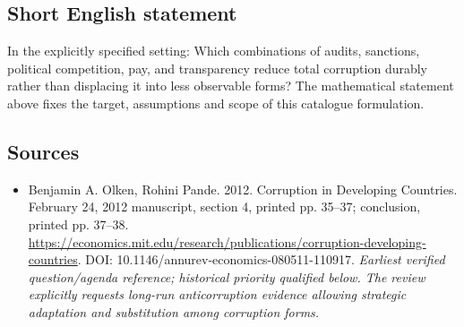 \documentclass[11pt]{article}
\begin{document}
\subsection{Short English statement}
In the explicitly specified setting: Which combinations of audits, sanctions, political competition, pay, and transparency reduce total corruption durably rather than displacing it into less observable forms? The mathematical statement above fixes the target, assumptions and scope of this catalogue formulation.

\subsection{Sources}
\begin{itemize}\raggedright
\item[\textnormal{[S1]}]\hypertarget{source:30007665:1}{} Benjamin A. Olken, Rohini Pande. 2012. Corruption in Developing Countries. February 24, 2012 manuscript, section 4, printed pp. 35–37; conclusion, printed pp. 37–38.
\url{https://economics.mit.edu/research/publications/corruption-developing-countries}.
DOI: 10.1146/annurev-economics-080511-110917.
{\small\textit{Earliest verified question/agenda reference; historical priority qualified below. The review explicitly requests long-run anticorruption evidence allowing strategic adaptation and substitution among corruption forms.}}
\end{itemize}
\end{document}
